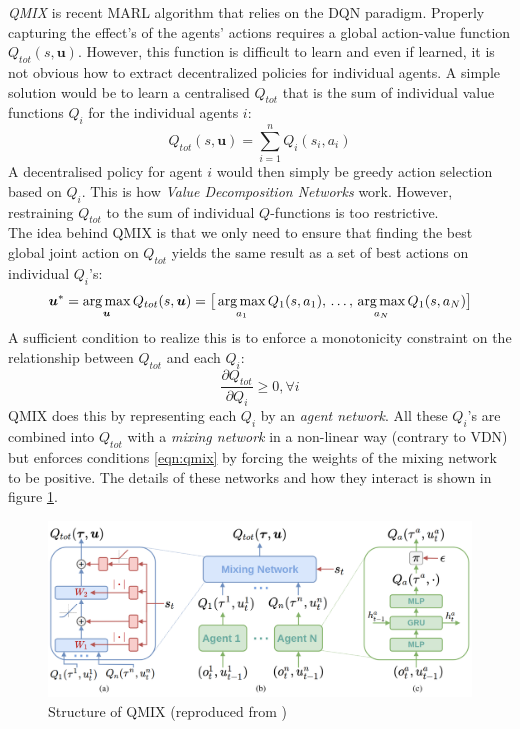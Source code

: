 \emph{QMIX} \cite{rashid2018qmix} is recent MARL algorithm that relies on the DQN paradigm. Properly capturing the effect's of the agents' actions requires a global action-value function $Q_{tot}(s, \bm{u})$. However,  this function is difficult to learn and even if learned, it is not obvious how to extract decentralized policies for individual agents. A simple solution would be to learn a centralised $Q_{tot}$ that is the sum of individual value functions $Q_i$ for the individual agents $i$:
\begin{equation}
    Q_{tot}(s, \bm{u}) = \sum_{i=1}^{n} Q_i(s_i, a_i)
\end{equation}
A decentralised policy for agent $i$ would then simply be greedy action selection based on $Q_i$. This is how \emph{Value Decomposition Networks} \cite{sunehag2018value} work. However, restraining $Q_{tot}$ to the sum of individual $Q$-functions is too restrictive.\\

The idea behind QMIX is that we only need to ensure that finding the best global joint action on $Q_{tot}$ yields the same result as a set of best actions on individual $Q_i$'s:
\begin{equation}
    \bm{u}^* = \operatorname*{arg\,max}_{\bm{u}} Q_{tot}(s, \bm{u}) = \big [ \operatorname*{arg\,max}_{a_1} Q_1(s, a_1), \, \ldots,\, \operatorname*{arg\,max}_{a_N} Q_1(s, a_N) \big ]
\end{equation}
A sufficient condition to realize this is to enforce a monotonicity constraint on the relationship between $Q_{tot}$ and each $Q_i$:
\begin{equation}
    \label{eqn:qmix}
    \frac{\partial Q_{tot}}{\partial Q_i} \geq 0, \forall i
\end{equation}
QMIX does this by representing each $Q_i$ by an \emph{agent network}. All these $Q_i$'s are combined into $Q_{tot}$ with a \emph{mixing network} in a non-linear way (contrary to VDN) but enforces conditions \ref{eqn:qmix} by forcing the weights of the mixing network to be positive. The details of these networks and how they interact is shown in figure \ref{fig:qmix_structure}.\\

\begin{figure}[htp]
    \centering
    \includegraphics[width=16cm]{images/qmix_structure.png}
    \caption{Structure of QMIX (reproduced from \cite{rashid2018qmix})}
    \label{fig:qmix_structure}
\end{figure}

